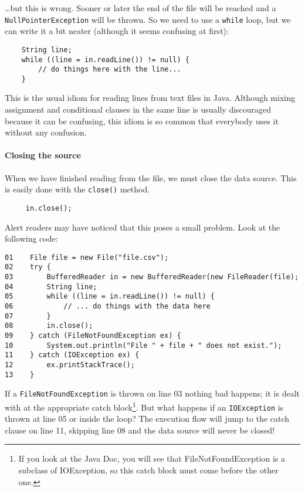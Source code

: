 \ldots but this is wrong. Sooner or later the end of the file will be
reached and a \verb+NullPointerException+ will be thrown. So we need
to use a \verb+while+ loop, but we can write it a bit neater (although
it seems confusing at first): 

\begin{verbatim}
    String line;
    while ((line = in.readLine()) != null) {
        // do things here with the line...
    }
\end{verbatim}

This is the usual idiom for reading lines from text files in
Java. Although mixing assignment and conditional clauses in the same
line is usually discouraged because it can be confusing, this idiom is
so common that everybody uses it without any confusion. 

\paragraph{Closing the source}
\label{sec:closing-source}

When we have finished reading from the file, we must close the
data source. This is easily done with the \verb+close()+ method. 

\begin{verbatim}
     in.close();
\end{verbatim}

Alert readers may have noticed that this poses a small problem. Look
at the following code: 

\begin{verbatim}
01    File file = new File("file.csv");
02    try {
03        BufferedReader in = new BufferedReader(new FileReader(file); 
04        String line;
05        while ((line = in.readLine()) != null) {
06            // ... do things with the data here
07        }
08        in.close();
09    } catch (FileNotFoundException ex) {
10        System.out.println("File " + file + " does not exist.");
11    } catch (IOException ex) {
12        ex.printStackTrace();
13    }    
\end{verbatim}

If a \verb+FileNotFoundException+ is thrown on 
line 03 nothing bad
happens; it is dealt with at the appropriate catch block\footnote{If
  you look at the Java Doc, you will see that FileNotFoundException is
  a subclass of IOException, so this catch block must come before the
  other one.}. But what
happens if an \verb+IOException+ is thrown at 
line 05 or inside the loop? 
The execution flow will jump to the catch clause on 
line 11, skipping 
line 08 
and the data source will never be closed! 

